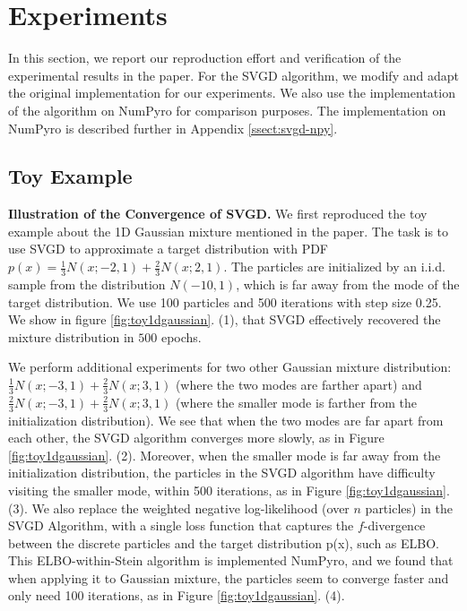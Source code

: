 \section{Experiments}
In this section, we report our reproduction effort and verification of the experimental results in the paper. For the SVGD algorithm, we modify and adapt the original implementation for our experiments. We also use the implementation of the algorithm on NumPyro for comparison purposes. The implementation on NumPyro is described further in Appendix \ref{ssect:svgd-npy}.

\subsection{Toy Example}


\noindent\textbf{Illustration of the Convergence of SVGD.} We first reproduced the toy example about the 1D Gaussian mixture mentioned in the paper. The task is to use SVGD to approximate a target distribution with PDF $p(x) = \frac{1}{3} N(x; -2, 1) + \frac{2}{3} N(x; 2, 1)$. The particles are initialized by an i.i.d. sample from the distribution $N(-10, 1)$, which is far away from the mode of the target distribution. We use 100 particles and 500 iterations with step size 0.25. We show in figure \ref{fig:toy1dgaussian}. (1), that SVGD effectively recovered the mixture distribution in $500$ epochs.

We perform additional experiments for two other Gaussian mixture distribution: $\frac{1}{3} N(x; -3, 1) + \frac{2}{3} N(x; 3, 1)$ (where the two modes are farther apart) and $\frac{2}{3} N(x; -3, 1) + \frac{2}{3} N(x; 3, 1)$ (where the smaller mode is farther from the initialization distribution). We see that when the two modes are far apart from each other, the SVGD algorithm converges more slowly, as in Figure  \ref{fig:toy1dgaussian}. (2). Moreover, when the smaller mode is far away from the initialization distribution, the particles in the SVGD algorithm have difficulty visiting the smaller mode, within 500 iterations, as in Figure  \ref{fig:toy1dgaussian}. (3). We also replace the weighted negative log-likelihood (over $n$ particles) in the SVGD Algorithm, with a single loss function that captures the $f$-divergence between the discrete particles and the target distribution p(x), such as ELBO. This ELBO-within-Stein algorithm is implemented NumPyro, and we found that when applying it to Gaussian mixture, the particles seem to converge faster and only need 100 iterations, as in Figure  \ref{fig:toy1dgaussian}. (4).

